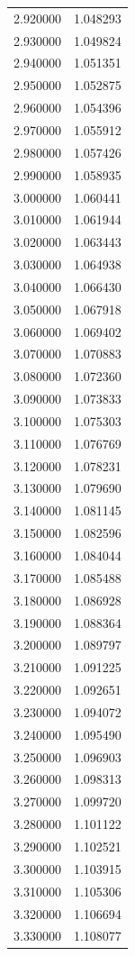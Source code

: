 \begin{tabular}{rr}
2.920000 & 1.048293 \\
2.930000 & 1.049824 \\
2.940000 & 1.051351 \\
2.950000 & 1.052875 \\
2.960000 & 1.054396 \\
2.970000 & 1.055912 \\
2.980000 & 1.057426 \\
2.990000 & 1.058935 \\
3.000000 & 1.060441 \\
3.010000 & 1.061944 \\
3.020000 & 1.063443 \\
3.030000 & 1.064938 \\
3.040000 & 1.066430 \\
3.050000 & 1.067918 \\
3.060000 & 1.069402 \\
3.070000 & 1.070883 \\
3.080000 & 1.072360 \\
3.090000 & 1.073833 \\
3.100000 & 1.075303 \\
3.110000 & 1.076769 \\
3.120000 & 1.078231 \\
3.130000 & 1.079690 \\
3.140000 & 1.081145 \\
3.150000 & 1.082596 \\
3.160000 & 1.084044 \\
3.170000 & 1.085488 \\
3.180000 & 1.086928 \\
3.190000 & 1.088364 \\
3.200000 & 1.089797 \\
3.210000 & 1.091225 \\
3.220000 & 1.092651 \\
3.230000 & 1.094072 \\
3.240000 & 1.095490 \\
3.250000 & 1.096903 \\
3.260000 & 1.098313 \\
3.270000 & 1.099720 \\
3.280000 & 1.101122 \\
3.290000 & 1.102521 \\
3.300000 & 1.103915 \\
3.310000 & 1.105306 \\
3.320000 & 1.106694 \\
3.330000 & 1.108077 \\

\end{tabular}
